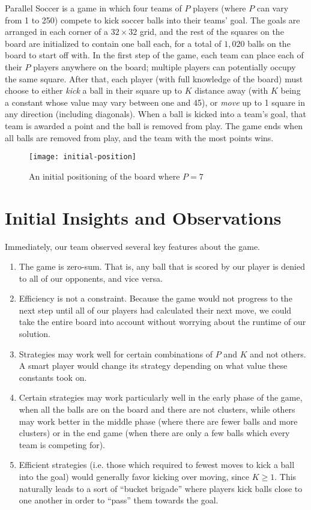 \documentclass[
10pt, %
letterpaper, %
oneside, %
headinclude,footinclude, %
english
]{article}
\begin{document}
Parallel Soccer is a game in which four teams of $P$ players (where $P$ can vary from 1 to 250) compete to kick soccer balls into their teams' goal. The goals are arranged in each corner of a $32 \times 32$ grid, and the rest of the squares on the board are initialized to contain one ball each, for a total of $1,020$ balls on the board to start off with. In the first step of the game, each team can place each of their $P$ players anywhere on the board; multiple players can potentially occupy the same square. After that, each player (with full knowledge of the board) must choose to either \textit{kick} a ball in their square up to $K$ distance away (with $K$ being a constant whose value may vary between one and 45), or \textit{move} up to 1 square in any direction (including diagonals). When a ball is kicked into a team's goal, that team is awarded a point and the ball is removed from play. The game ends when all balls are removed from play, and the team with the most points wins.

\begin{figure}[ht!]
\centering 
\texttt{[image: initial-position]} 
\caption[Initial board of a parallel football game]{An initial positioning of the board where $P=7$}
\label{fig:gallery} 
\end{figure}
\pagebreak

\section{Initial Insights and Observations}

Immediately, our team observed several key features about the game. 

\begin{enumerate}
  \item The game is zero-sum. That is, any ball that is scored by our player is denied to all of our opponents, and vice versa.
  \item Efficiency is not a constraint. Because the game would not progress to the next step until all of our players had calculated their next move, we could take the entire board into account without worrying about the runtime of our solution.
  \item Strategies may work well for certain combinations of $P$ and $K$ and not others. A smart player would change its strategy depending on what value these constants took on.
  \item Certain strategies may work particularly well in the early phase of the game, when all the balls are on the board and there are not clusters, while others may work better in the middle phase (where there are fewer balls and more clusters) or in the end game (when there are only a few balls which every team is competing for).
  \item Efficient strategies (i.e. those which required to fewest moves to kick a ball into the goal) would generally favor kicking over moving, since $K \geq 1$. This naturally leads to a sort of ``bucket brigade'' where players kick balls close to one another in order to ``pass'' them towards the goal.
\end{enumerate}
\end{document}
